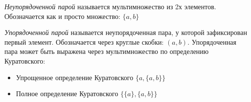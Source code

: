 \begin{definition}
	\textit{Неупорядоченной парой} называется мультимножество из 2х элементов. Обозначается как и просто множество: $\{a, b\}$
\end{definition}

\begin{definition}
	\textit{Упорядоченной парой} называется неупорядоченная пара, у которой зафиксирован первый элемент. Обозначается через круглые скобки: $(a, b)$. Упорядоченная пара может быть выражена через мультимножество по определению Куратовского:
	\begin{itemize}
		\item Упрощенное определение Куратовского $\{a, \{a, b\}\}$
		\item Полное определение Куратовского $\{\{a\}, \{a, b\}\}$
	\end{itemize}
\end{definition}